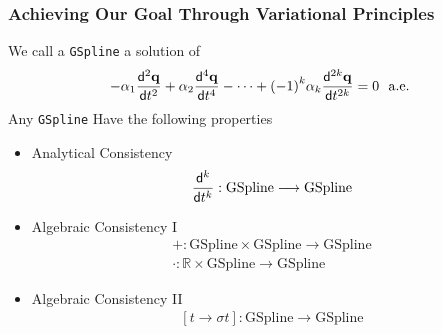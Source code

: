 \begin{frame}[t]
	\frametitle{Achieving Our Goal Through Variational Principles}
	{\fontsize{9}{5}
		We call a \texttt{GSpline} a solution of
		\begin{equation*}
			-\alpha_1 \diffk{\qv}{t}{2}+ \alpha_2 \diffk{\qv}{t}{4}- \cdots +  {(-1)}^k \alpha_k \diffk{\qv}{t}{2k}= 0 \ \ \text{a.e.}
		\end{equation*}
		Any \texttt{GSpline} Have the following properties
		\begin{itemize}
			\item Analytical Consistency
			      \begin{equation*}
				      \frac{\mathsf{d}^{k} }{\mathsf{d} t^{k}}:\text{GSpline}\longrightarrow \text{GSpline}
			      \end{equation*}
			\item Algebraic Consistency I
			      \begin{eqnarray*}
				      +:\text{GSpline}\times\text{GSpline}\longrightarrow \text{GSpline}\\
				      \cdot:\mathbb{R} \times \text{GSpline}\longrightarrow \text{GSpline}
			      \end{eqnarray*}
			\item Algebraic Consistency II
			      \begin{eqnarray*}
				      \left[t \rightarrow \sigma t \right]:\text{GSpline}\longrightarrow \text{GSpline}
			      \end{eqnarray*}
		\end{itemize}
	}
\end{frame}
